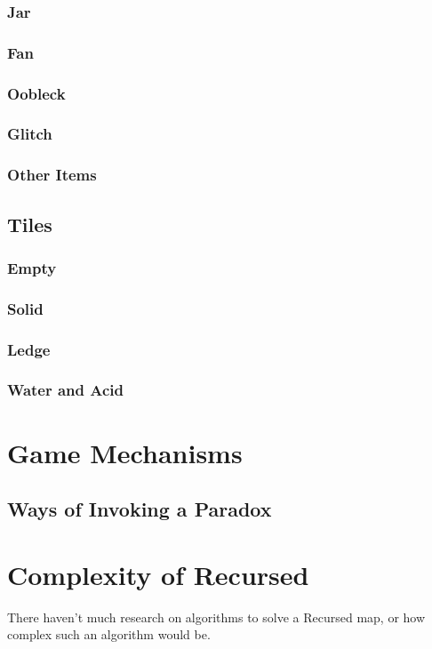 \documentclass[a4paper]{article}
\theoremstyle{definition}
\begin{document}
\subsubsection{Jar}
\subsubsection{Fan}
\subsubsection{Oobleck}
\subsubsection{Glitch}
\subsubsection{Other Items}

\subsection{Tiles}
\subsubsection{Empty}
\subsubsection{Solid}
\subsubsection{Ledge}
\subsubsection{Water and Acid}

\section{Game Mechanisms}
\subsection{Ways of Invoking a Paradox}

\section{Complexity of Recursed}
There haven't much research on algorithms to solve a Recursed map, or how complex such an algorithm would be.
\end{document}

